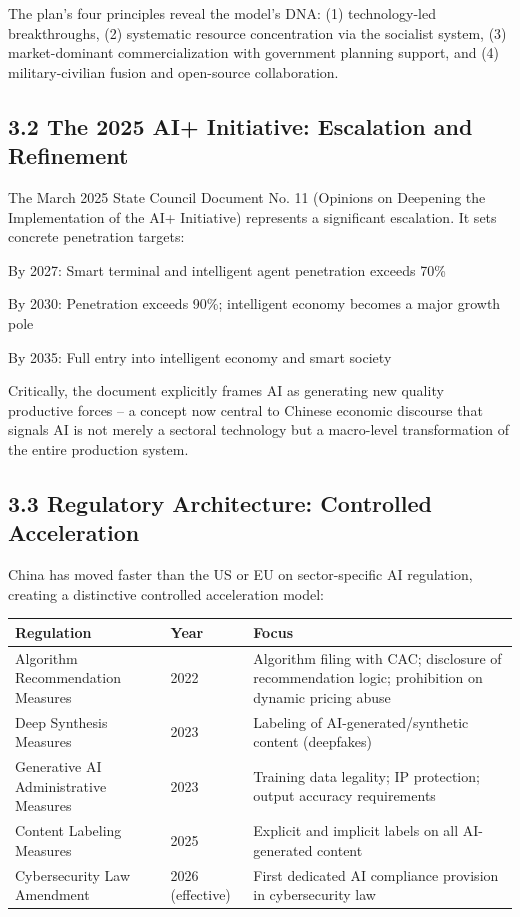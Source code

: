\documentclass[11pt,a4paper]{article}
\begin{document}
The plan's four principles reveal the model's DNA: (1) technology-led breakthroughs, (2) systematic resource concentration via the socialist system, (3) market-dominant commercialization with government planning support, and (4) military-civilian fusion and open-source collaboration.

\subsection{3.2 The 2025 AI+ Initiative: Escalation and Refinement}

The March 2025 State Council Document No. 11 (Opinions on Deepening the Implementation of the AI+ Initiative) represents a significant escalation. It sets concrete penetration targets:
\item By 2027: Smart terminal and intelligent agent penetration exceeds 70\%
\item By 2030: Penetration exceeds 90\%; intelligent economy becomes a major growth pole
\item By 2035: Full entry into intelligent economy and smart society

Critically, the document explicitly frames AI as generating new quality productive forces -- a concept now central to Chinese economic discourse that signals AI is not merely a sectoral technology but a macro-level transformation of the entire production system.

\subsection{3.3 Regulatory Architecture: Controlled Acceleration}

China has moved faster than the US or EU on sector-specific AI regulation, creating a distinctive controlled acceleration model:

\begin{table}[h]
\centering\small
\begin{tabular}{@{lll@}}
\toprule
Regulation & Year & Focus \\
\midrule
Algorithm Recommendation Measures & 2022 & Algorithm filing with CAC; disclosure of recommendation logic; prohibition on dynamic pricing abuse \\
Deep Synthesis Measures & 2023 & Labeling of AI-generated/synthetic content (deepfakes) \\
Generative AI Administrative Measures & 2023 & Training data legality; IP protection; output accuracy requirements \\
Content Labeling Measures & 2025 & Explicit and implicit labels on all AI-generated content \\
Cybersecurity Law Amendment & 2026 (effective) & First dedicated AI compliance provision in cybersecurity law \\
\bottomrule
\end{tabular}
\end{table}
\end{document}
